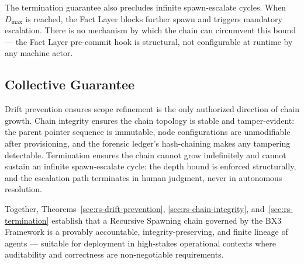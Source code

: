 The termination guarantee also precludes infinite spawn-escalate cycles. When $D_{\mathrm{max}}$ is reached, the Fact Layer blocks further spawn and triggers mandatory escalation. There is no mechanism by which the chain can circumvent this bound — the Fact Layer pre-commit hook is structural, not configurable at runtime by any machine actor.

\subsection{Collective Guarantee}
\label{sec:rs-collective-guarantee}

Drift prevention ensures scope refinement is the only authorized direction of chain growth. Chain integrity ensures the chain topology is stable and tamper-evident: the parent pointer sequence is immutable, node configurations are unmodifiable after provisioning, and the forensic ledger's hash-chaining makes any tampering detectable. Termination ensures the chain cannot grow indefinitely and cannot sustain an infinite spawn-escalate cycle: the depth bound is enforced structurally, and the escalation path terminates in human judgment, never in autonomous resolution.

Together, Theorems~\ref{sec:rs-drift-prevention}, \ref{sec:rs-chain-integrity}, and~\ref{sec:rs-termination} establish that a Recursive Spawning chain governed by the BX3 Framework is a provably accountable, integrity-preserving, and finite lineage of agents — suitable for deployment in high-stakes operational contexts where auditability and correctness are non-negotiable requirements.